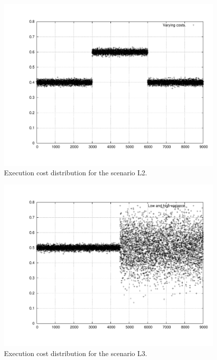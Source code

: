 \documentclass[times, 10pt,twocolumn]{article}
\begin{document}
\begin{figure}[h!t]
  \centering
  \includegraphics[scale=0.33]{trace-trifasico}
  \caption{Execution cost distribution for the scenario L2.}
  \label{fig:plotl2}
\end{figure}

\begin{figure}[h!t]
  \centering
  \includegraphics[scale=0.33]{trace-variance}
  \caption{Execution cost distribution for the scenario L3.}
  \label{fig:plotl3}
\end{figure}
\end{document}
